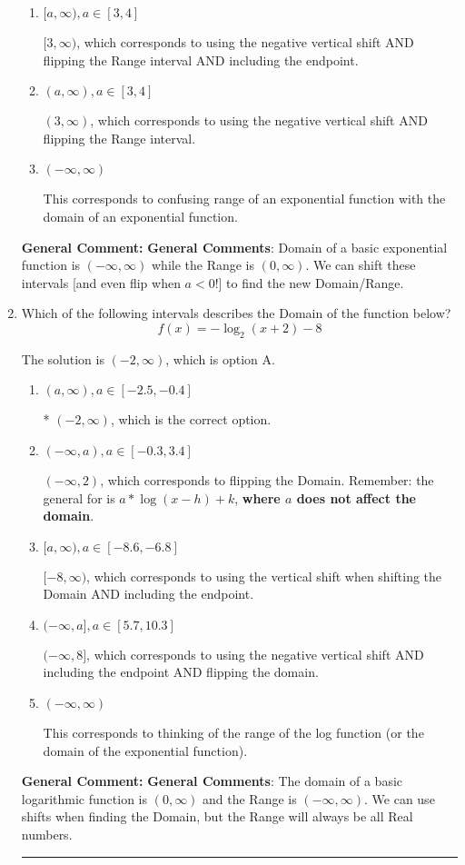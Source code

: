 \documentclass{extbook}[14pt]
\newcommand{\litem}[1]{\item #1

\rule{\textwidth}{0.4pt}}
\begin{document}
\begin{enumerate}
{\begin{enumerate}[label=\Alph*.]
$(-\infty, -3]$, which corresponds to including the endpoint.
\item \( [a, \infty), a \in [3, 4] \)

$[3, \infty)$, which corresponds to using the negative vertical shift AND flipping the Range interval AND including the endpoint.
\item \( (a, \infty), a \in [3, 4] \)

$(3, \infty)$, which corresponds to using the negative vertical shift AND flipping the Range interval.
\item \( (-\infty, \infty) \)

This corresponds to confusing range of an exponential function with the domain of an exponential function.
\end{enumerate}

\textbf{General Comment:} \textbf{General Comments}: Domain of a basic exponential function is $(-\infty, \infty)$ while the Range is $(0, \infty)$. We can shift these intervals [and even flip when $a<0$!] to find the new Domain/Range.
}
\litem{
Which of the following intervals describes the Domain of the function below?
\[ f(x) = -\log_2{(x+2)}-8 \]

The solution is \( (-2, \infty) \), which is option A.\begin{enumerate}[label=\Alph*.]
\item \( (a, \infty), a \in [-2.5, -0.4] \)

* $(-2, \infty)$, which is the correct option.
\item \( (-\infty, a), a \in [-0.3, 3.4] \)

$(-\infty, 2)$, which corresponds to flipping the Domain. Remember: the general for is $a*\log(x-h)+k$, \textbf{where $a$ does not affect the domain}.
\item \( [a, \infty), a \in [-8.6, -6.8] \)

$[-8, \infty)$, which corresponds to using the vertical shift when shifting the Domain AND including the endpoint.
\item \( (-\infty, a], a \in [5.7, 10.3] \)

$(-\infty, 8]$, which corresponds to using the negative vertical shift AND including the endpoint AND flipping the domain.
\item \( (-\infty, \infty) \)

This corresponds to thinking of the range of the log function (or the domain of the exponential function).
\end{enumerate}

\textbf{General Comment:} \textbf{General Comments}: The domain of a basic logarithmic function is $(0, \infty)$ and the Range is $(-\infty, \infty)$. We can use shifts when finding the Domain, but the Range will always be all Real numbers.
}
\end{enumerate}
\end{document}
